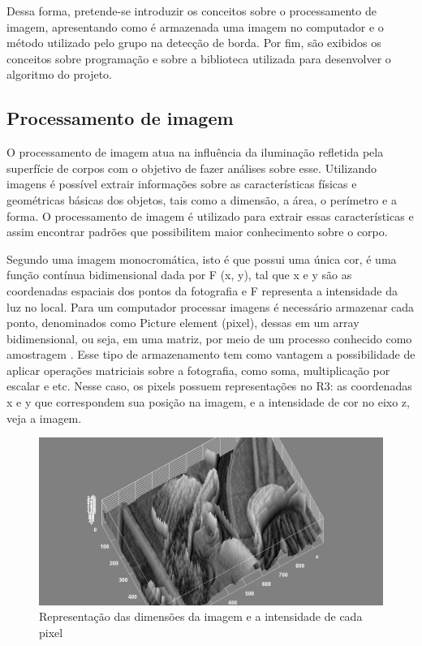\documentclass[12pt]{article}
\begin{document}
	Dessa forma, pretende-se introduzir os conceitos sobre o processamento de imagem, apresentando como é armazenada uma imagem no computador e o método utilizado pelo grupo na detecção de borda. Por fim, são exibidos os conceitos sobre programação e sobre a biblioteca utilizada para desenvolver o algoritmo do projeto.
	
	\subsection{Processamento de imagem}
	O processamento de imagem atua na influência da iluminação refletida pela superfície de corpos com o objetivo de fazer análises sobre esse. Utilizando imagens é possível extrair informações sobre as características físicas e geométricas básicas dos objetos, tais como a dimensão, a área, o perímetro e a forma. O processamento de imagem é utilizado para extrair essas características e assim encontrar padrões que possibilitem maior conhecimento sobre o corpo.
	
	Segundo \cite{de2006introduccao} uma imagem monocromática, isto é que possui uma única cor, é uma função contínua bidimensional dada por F (x, y), tal que x e y são as coordenadas espaciais dos pontos da fotografia e F representa a intensidade da luz no local. Para um computador processar imagens é necessário armazenar cada ponto, denominados como Picture element (pixel), dessas em um array bidimensional, ou seja, em uma matriz, por meio de um processo conhecido como amostragem \citep{silva2000segmentaccao}. Esse tipo de armazenamento tem como vantagem a possibilidade de aplicar operações matriciais sobre a fotografia, como soma, multiplicação por escalar e etc. Nesse caso, os pixels possuem representações no R3: as coordenadas x e y que correspondem sua posição na imagem, e a intensidade de cor no eixo z, veja a imagem.
	
	\begin{figure}[h!]
		\centering
		\includegraphics[width=0.7\linewidth]{img/img1}
		\caption{Representação das dimensões da imagem e a intensidade de cada pixel}
		\label{fig:img1}
	\end{figure}
	
\end{document}
